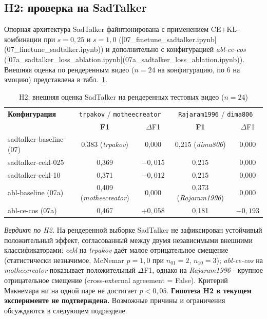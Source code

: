 \documentclass[a4paper, 12pt, oneside, openany]{article}
\begin{document}
\subsection{H2: проверка на SadTalker}

Опорная архитектура SadTalker файнтюнирована с применением CE+KL-комбинации при $s=0{,}25$ и $s=1{,}0$ ([07\_finetune\_sadtalker.ipynb](07\_finetune\_sadtalker.ipynb)) и дополнительно с конфигурацией \textit{abl-ce-cos} ([07a\_sadtalker\_loss\_ablation.ipynb](07a\_sadtalker\_loss\_ablation.ipynb)). Внешняя оценка по рендеренным видео ($n=24$ на конфигурацию, по 6 на эмоцию) представлена в табл.~\ref{tab:h2_test}.

\begin{table}[H]
\caption{H2: внешняя оценка SadTalker на рендеренных тестовых видео ($n=24$)}
\label{tab:h2_test}
\centering
\small
\begin{tabular}{|p{4cm}|c|c|c|c|}
\hline
\textbf{Конфигурация} & \multicolumn{2}{c|}{\texttt{trpakov} / \texttt{motheecreator}} & \multicolumn{2}{c|}{\texttt{Rajaram1996} / \texttt{dima806}} \\
 & \textbf{F1} & $\Delta$F1 & \textbf{F1} & $\Delta$F1 \\
\hline
sadtalker-baseline (07) & 0,383 (\textit{trpakov}) & 0,000 & 0,215 (\textit{dima806}) & 0,000 \\
\hline
sadtalker-cekl-025 & 0,369 & $-0,015$ & 0,215 & 0,000 \\
\hline
sadtalker-cekl-10 & 0,371 & $-0,012$ & 0,215 & 0,000 \\
\hline
abl-baseline (07a) & 0,409 (\textit{motheecreator}) & 0,000 & 0,373 (\textit{Rajaram1996}) & 0,000 \\
\hline
abl-ce-cos (07a) & 0,467 & $+0,058$ & 0,181 & $-0,193$ \\
\hline
\end{tabular}
\end{table}

\textit{Вердикт по H2.} На рендеренной выборке SadTalker не зафиксирован устойчивый положительный эффект, согласованный между двумя независимыми внешними классификаторами: \textit{cekl} на \textit{trpakov} даёт малое отрицательное смещение (статистически незначимое, McNemar $p=1{,}0$ при $n_{01}=2$, $n_{10}=3$); \textit{abl-ce-cos} на \textit{motheecreator} показывает положительный $\Delta$F1, однако на \textit{Rajaram1996} - крупное отрицательное смещение (cross-external agreement = False). Критерий Макнемара ни на одной паре не достигает $p<0{,}05$. \textbf{Гипотеза H2 в текущем эксперименте не подтверждена.} Возможные причины и ограничения обсуждаются в следующем подразделе.
\end{document}
